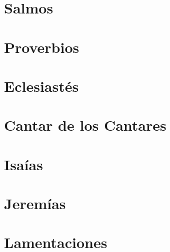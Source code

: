 \chapter{Salmos}
\begin{multicols}{2}
  \raggedcolumns
  \parskip=0pt \relax
  
\end{multicols}

\chapter{Proverbios}
\begin{multicols}{2}
  \raggedcolumns
  \parskip=0pt \relax
  
\end{multicols}

\chapter{Eclesiastés}
\begin{multicols}{2}
  \raggedcolumns
  \parskip=0pt \relax
  
\end{multicols}

\chapter{Cantar de los Cantares}
\begin{multicols}{2}
  \raggedcolumns
  \parskip=0pt \relax
  
\end{multicols}

\chapter{Isaías}
\begin{multicols}{2}
  \raggedcolumns
  \parskip=0pt \relax
  
\end{multicols}

\chapter{Jeremías}
\begin{multicols}{2}
  \raggedcolumns
  \parskip=0pt \relax
  
\end{multicols}

\chapter{Lamentaciones}
\begin{multicols}{2}
  \raggedcolumns
  \parskip=0pt \relax
  
\end{multicols}

